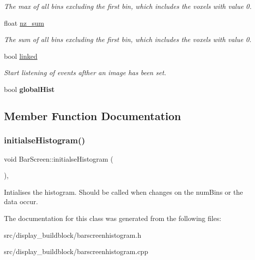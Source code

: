 \begin{DoxyCompactItemize}
\begin{DoxyCompactList}\small\item\em The max of all bins excluding the first bin, which includes the voxels with value 0. \end{DoxyCompactList}\item 
\mbox{\label{classBarScreen_adf2fa1b3686c92bd20e8c0befc06caf7}} 
float \mbox{\hyperlink{classBarScreen_adf2fa1b3686c92bd20e8c0befc06caf7}{nz\+\_\+sum}}
\begin{DoxyCompactList}\small\item\em The sum of all bins excluding the first bin, which includes the voxels with value 0. \end{DoxyCompactList}\item 
\mbox{\label{classBarScreen_a2222951d5a5ce44bb22da49e62e8f797}} 
bool \mbox{\hyperlink{classBarScreen_a2222951d5a5ce44bb22da49e62e8f797}{linked}}
\begin{DoxyCompactList}\small\item\em Start listening of events afther an image has been set. \end{DoxyCompactList}\item 
\mbox{\label{classBarScreen_a3c0cbb54bb95017b259687ee79232a08}} 
bool {\bfseries global\+Hist}
\end{DoxyCompactItemize}


\subsection{Member Function Documentation}
\mbox{\label{classBarScreen_ae652343345f7cc3f7726569c1195ee9a}} 
\subsubsection{\texorpdfstring{initialse\+Histogram()}{initialseHistogram()}}
{\footnotesize\ttfamily void Bar\+Screen\+::initialse\+Histogram (\begin{DoxyParamCaption}{ }\end{DoxyParamCaption})\hspace{0.3cm}{\ttfamily [protected]}, {\ttfamily [inherited]}}

Intialises the histogram. Should be called when changes on the num\+Bins or the data occur. 

The documentation for this class was generated from the following files\+:\begin{DoxyCompactItemize}
\item 
src/display\+\_\+buildblock/barscreenhistogram.\+h\item 
src/display\+\_\+buildblock/barscreenhistogram.\+cpp\end{DoxyCompactItemize}
